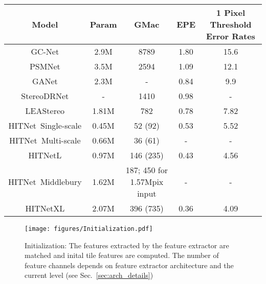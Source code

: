 \documentclass[final]{cvpr}
\newcommand{\algoname}{HITNet}
\begin{document}
\begin{table*}[htb]
\begin{center}
\begin{tabular}{|c|c|c|c|c|}
\hline
 Model & Param & GMac & EPE & 1 Pixel Threshold Error Rates \\
\hline
GC-Net \cite{kendall2017end} &  2.9M \cite{Zhang2019GANet} & 8789 \cite{chabra2019stereodrnet} & 1.80 \cite{Zhang2019GANet} & 15.6 \cite{Zhang2019GANet} \\
PSMNet \cite{chang2018pyramid} &  3.5M \cite{Zhang2019GANet} & 2594 \cite{chabra2019stereodrnet}& 1.09 \cite{Zhang2019GANet} & 12.1 \cite{Zhang2019GANet} \\
GANet \cite{Zhang2019GANet} & 2.3M \cite{Zhang2019GANet} & - & 0.84 \cite{Zhang2019GANet} & 9.9 \cite{Zhang2019GANet} \\
StereoDRNet \cite{chabra2019stereodrnet} & - & 1410 \cite{chabra2019stereodrnet} & 0.98 \cite{chabra2019stereodrnet} & - \\
LEAStereo \cite{cheng2020hierarchical} & 1.81M \cite{cheng2020hierarchical} & 782 \cite{cheng2020hierarchical} & 0.78 \cite{cheng2020hierarchical} & 7.82 \cite{cheng2020hierarchical} \\
\algoname \ Single-scale &  0.45M & 52 (92) & 0.53 & 5.52 \\
\algoname \ Multi-scale &  0.66M & 36 (61) & - & - \\
\algoname L &  0.97M & 146 (235) & 0.43 & 4.56 \\
\algoname \ Middlebury &  1.62M & 187; 450 for 1.57Mpix input & - & - \\
\algoname XL &  2.07M & 396 (735) & 0.36 & 4.09 \\
\hline
\end{tabular}
\caption{Comparisons of number of parameters and GMacs (Giga Multiply-accumulate operations) with other methods on Scene Flow ``finalpass'' dataset ( inputs). The numbers were partially adopted from the papers cited in the table. The lower the better. The multi-scale version of \algoname \ is used for ETH3d and KITTI submissions, GMac is provided for  inputs. The GMac number in parenthesis is for predicting both disparity maps, sharing the feature extractor.}
\label{tab:parameters}
\end{center}
\vspace{-20pt}
\end{table*}


\begin{figure}[h]
\vspace{-10pt}
    \centering
    \texttt{[image: figures/Initialization.pdf]}
    \caption{Initialization: The features extracted by the feature extractor are matched and inital tile features are computed. The number of feature channels  depends on feature extractor architecture and the current level (see Sec.~\ref{sec:arch_details})}
    \label{fig:initialization}
\end{figure}
\end{document}
